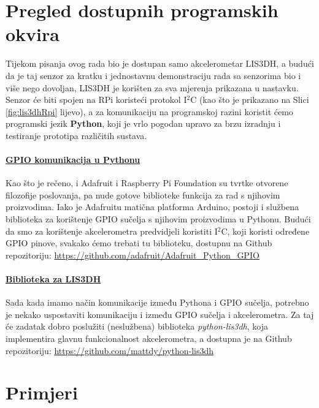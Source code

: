 \documentclass[12pt,a4paper]{article}
\begin{document}
\section{Pregled dostupnih programskih okvira}
Tijekom pisanja ovog rada bio je dostupan samo akcelerometar LIS3DH, a budući da je taj senzor za kratku i jednostavnu demonstraciju rada sa senzorima bio i više nego dovoljan, LIS3DH je korišten za sva mjerenja prikazana u nastavku. Senzor će biti spojen na RPi koristeći protokol I$^2$C (kao što je prikazano na Slici \ref{fig:lis3dhRpi} lijevo), a za komunikaciju na programskoj razini koristit ćemo programski jezik \textbf{Python}, koji je vrlo pogodan upravo za brzu izradnju i testiranje prototipa različitih sustava.

\paragraph{\underline{GPIO komunikacija u Pythonu}} %
	\label{par:gpio_py}
		Kao što je rečeno, i Adafruit i Raspberry Pi Foundation su tvrtke otvorene filozofije poslovanja, pa nude gotove biblioteke funkcija za rad s njihovim proizvodima. Iako je Adafruitu matična platforma Arduino, postoji i službena biblioteka za korištenje GPIO sučelja s njihovim proizvodima u Pythonu. Budući da smo za korištenje akcelerometra predvidjeli koristiti I$^2$C, koji koristi određene GPIO pinove, svakako ćemo trebati tu biblioteku, dostupnu na Github repozitoriju: \url{https://github.com/adafruit/Adafruit_Python_GPIO}
		

\paragraph{\underline{Biblioteka za LIS3DH}} %
	\label{par:lis3dh_lib}
		Sada kada imamo način komunikacije između Pythona i GPIO sučelja, potrebno je nekako uspostaviti komunikaciju i između GPIO sučelja i akcelerometra. Za taj će zadatak dobro poslužiti (neslužbena) biblioteka \textit{python-lis3dh}, koja implementira glavnu funkcionalnost akcelerometra, a dostupna je na Github repozitoriju: \url{https://github.com/mattdy/python-lis3dh}




\newpage
\section{Primjeri}
\end{document}
